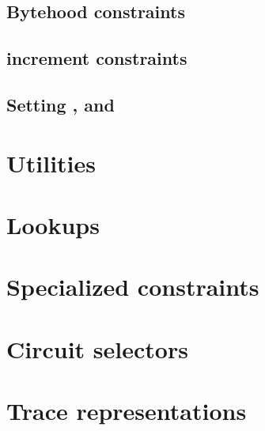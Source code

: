 \subsection{Bytehood constraints}                                           \label{bls: bytehood and accumulator}                                
\subsection{\blsId{} increment constraints}                                 \label{bls: stamp increments}                                        

\subsection{Setting \malformedDataExternalBit, \malformedDataExternalAcc{} and \malformedDataExternalJustification}     \label{bls: malformed bit acc justification}                    

\section{Utilities}                       \label{bls: utilities}                       
\section{Lookups}                         \label{bls: lookups}                         
\section{Specialized constraints}         \label{bls: specialized constraints}         
\section{Circuit selectors}               \label{bls: circuit selectors}               
\section{Trace representations}           \label{bls: trace representations}           
